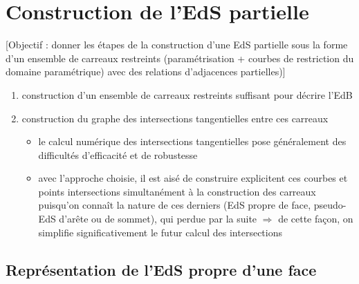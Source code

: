 






\section{Construction de l'EdS partielle}
\label{section:construction_EdS_partielle}

[Objectif : donner les étapes de la construction d'une EdS partielle sous la forme d'un ensemble de carreaux restreints (paramétrisation + courbes de restriction du domaine paramétrique) avec des relations d'adjacences partielles)]


\begin{enumerate}
	\item construction d'un ensemble de carreaux restreints suffisant pour décrire l'EdB 
	\item construction du graphe des intersections tangentielles entre ces carreaux
	\begin{itemize}
		\item le calcul numérique des intersections tangentielles pose généralement des difficultés d'efficacité et de robustesse
		\item avec l'approche choisie, il est aisé de construire explicitent ces courbes et points intersections simultanément à la construction des carreaux puisqu'on connaît la nature de ces derniers (EdS propre de face, pseudo-EdS d'arête ou de sommet), qui perdue par la suite $\Rightarrow$ de cette façon, on simplifie significativement le futur calcul des intersections
	\end{itemize}
\end{enumerate}



\subsection{Représentation de l'EdS propre d'une face \brep}%
\label{section:parametrisation_eds_propre_face}

